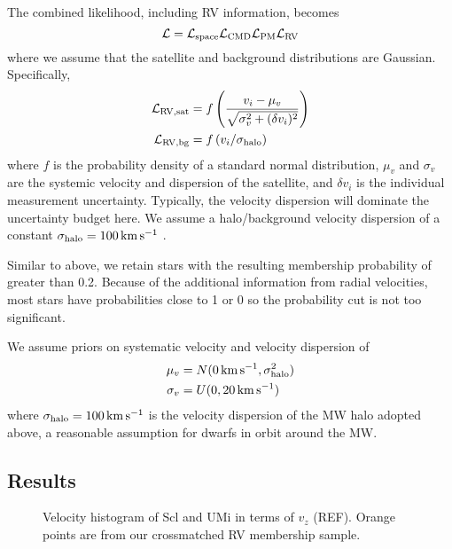 The combined likelihood, including RV information, becomes
\begin{equation}
{\cal L} = {\cal L}_{\rm space} {\cal L}_{\rm CMD} {\cal L}_{\rm PM} {\cal L}_{\rm RV}
\end{equation} where we assume that the satellite and background
distributions are Gaussian. Specifically, \begin{equation}
\begin{split}
{\cal L}_{\rm RV, sat} &= f\left( \frac{v_i -\mu_{v}}{\sqrt{\sigma_{v}^2 + (\delta v_i)^2}}\right) \\
{\cal L}_{\rm RV, bg} &= f\left( v_i /  \sigma_{\rm halo} \right)
\end{split}
\end{equation} where \(f\) is the probability density of a standard
normal distribution, \(\mu_v\) and \(\sigma_v\) are the systemic
velocity and dispersion of the satellite, and \(\delta v_i\) is the
individual measurement uncertainty. Typically, the velocity dispersion
will dominate the uncertainty budget here. We assume a halo/background
velocity dispersion of a constant \(\sigma_{\rm halo} = 100\,{\rm km\,s^{-1}}\)
\citep[e.g.][]{brown+2010}.

Similar to above, we retain stars with the resulting membership
probability of greater than 0.2. Because of the additional information
from radial velocities, most stars have probabilities close to 1 or 0 so
the probability cut is not too significant.

We assume priors on systematic velocity and velocity dispersion of
\begin{equation}
\begin{split}
\mu_{v} &= N(0\,{\rm km\,s^{-1}}, \sigma_{\rm halo}^2) \\ 
\sigma_{v} &= U(0, 20\,{\rm km\,s^{-1}})
\end{split}
\end{equation} where \(\sigma_{\rm halo} = 100\,{\rm km\,s^{-1}}\) is
the velocity dispersion of the MW halo adopted above, a reasonable
assumption for dwarfs in orbit around the MW.

\subsection{Results}\label{sec:rv_results}

\begin{figure}
\centering
{}
\caption[LOS velocity fit to Scl.]{Velocity histogram of Scl and UMi in
terms of \(v_z\) (REF). Orange points are from our crossmatched RV
membership sample.}
\end{figure}

